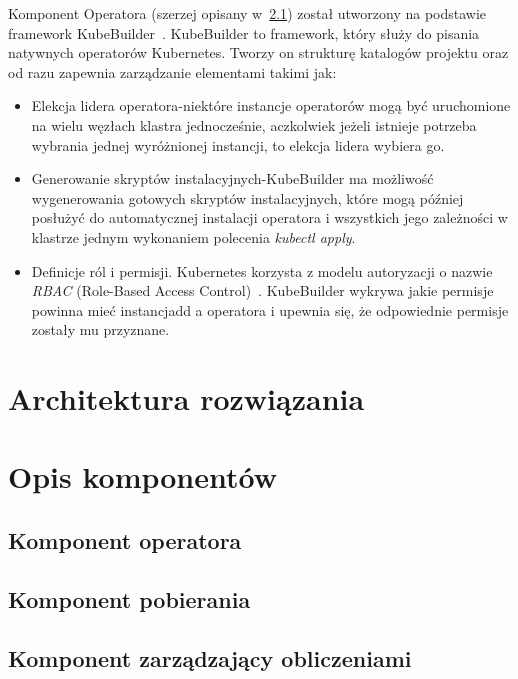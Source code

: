 Komponent Operatora (szerzej opisany w~\ref{subsec:component-operator}) został utworzony na podstawie framework KubeBuilder~\cite{kubebuilder}.
KubeBuilder to framework, który służy do pisania natywnych operatorów Kubernetes.
Tworzy on strukturę katalogów projektu oraz od razu zapewnia zarządzanie elementami takimi jak:
\begin{itemize}
    \item Elekcja lidera operatora-niektóre instancje operatorów mogą być uruchomione na wielu węzłach klastra jednocześnie, aczkolwiek jeżeli istnieje potrzeba wybrania jednej wyróżnionej instancji, to elekcja lidera wybiera go.
    \item Generowanie skryptów instalacyjnych-KubeBuilder ma możliwość wygenerowania gotowych skryptów instalacyjnych, które mogą później posłużyć do automatycznej instalacji operatora i wszystkich jego zależności w klastrze jednym wykonaniem polecenia \textit{kubectl apply}.
    \item Definicje ról i permisji.
    Kubernetes korzysta z modelu autoryzacji o nazwie \textit{RBAC} (Role-Based Access Control)~\cite{k8s_rbac}.
    KubeBuilder wykrywa jakie permisje powinna mieć instancjadd a operatora i upewnia się, że odpowiednie permisje zostały mu przyznane.
\end{itemize}


\section{Architektura rozwiązania}


\section{Opis komponentów}

\subsection{Komponent operatora}\label{subsec:component-operator}

\subsection{Komponent pobierania}\label{subsec:component-downloader}

\subsection{Komponent zarządzający obliczeniami}\label{subsec:component-manager}